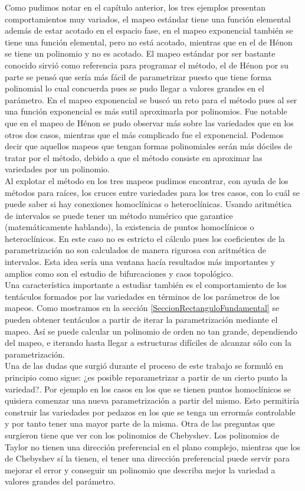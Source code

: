 Como pudimos notar en el capítulo anterior, los tres ejemplos presentan comportamientos muy variados, el mapeo estándar tiene una función elemental además de estar acotado en el espacio fase, en el mapeo exponencial también se tiene una función elemental, pero no está acotado, mientras que en el de Hénon se tiene un polinomio y no es acotado. El mapeo estándar por ser bastante conocido sirvió como referencia para programar el método, el de Hénon por su parte se pensó que sería más fácil de parametrizar puesto que tiene forma polinomial lo cual concuerda pues se pudo llegar a valores grandes en el parámetro. En el mapeo exponencial se buscó un reto para el método pues al ser una función exponencial es más sutil aproximarla por polinomios. Fue notable que en el mapeo de Hénon se pudo observar más sobre las variedades que en los otros dos casos, mientras que el más complicado fue el exponencial. Podemos decir que aquellos mapeos que tengan formas polinomiales serán más dóciles de tratar por el método, debido a que el método consiste en aproximar las variedades por un polinomio.\\

Al explotar el método en los tres mapeos pudimos encontrar, con ayuda de los métodos para raíces, los cruces entre variedades para los tres casos, con lo cuál se puede saber si hay conexiones homoclínicas o heteroclínicas. Usando aritmética de intervalos se puede tener un método numérico que garantice (matemáticamente hablando), la existencia de puntos homoclínicos o heteroclínicos. En este caso no es estricto el cálculo pues los coeficientes de la parametrización no son calculados de manera rigurosa con aritmética de intervalos. Esta idea sería una ventana hacía resultados más importantes y amplios como son el estudio de bifurcaciones y caos topológico.\\

Una característica importante a estudiar también es el comportamiento de los tentáculos formados por las variedades en términos de los parámetros de los mapeos. Como mostramos en la sección \ref{SeccionRectanguloFundamental} se pueden obtener tentáculos a partir de iterar la parametrización mediante el mapeo. Así se puede calcular un polinomio de orden no tan grande, dependiendo del mapeo, e iterando hasta llegar a estructuras difíciles de alcanzar sólo con la parametrización.\\

Una de las dudas que surgió durante el proceso de este trabajo se formuló en principio como sigue: ¿es posible reparametrizar a partir de un cierto punto la variedad?. Por ejemplo en los casos en los que se tienen puntos homoclínicos se quisiera comenzar una nueva parametrización a partir del mismo. Esto permitiría construir las variedades por pedazos en los que se tenga un errormás controlable y por tanto tener una mayor parte de la misma. Otra de las preguntas que surgieron tiene que ver con los polinomios de Chebyshev. Los polinomios de Taylor no tienen una dirección preferencial en el plano complejo, mientras que los de Chebyshev sí la tienen, el tener una dirección preferencial puede servir para mejorar el error y conseguir un polinomio que describa mejor la variedad a valores grandes del parámetro. 
